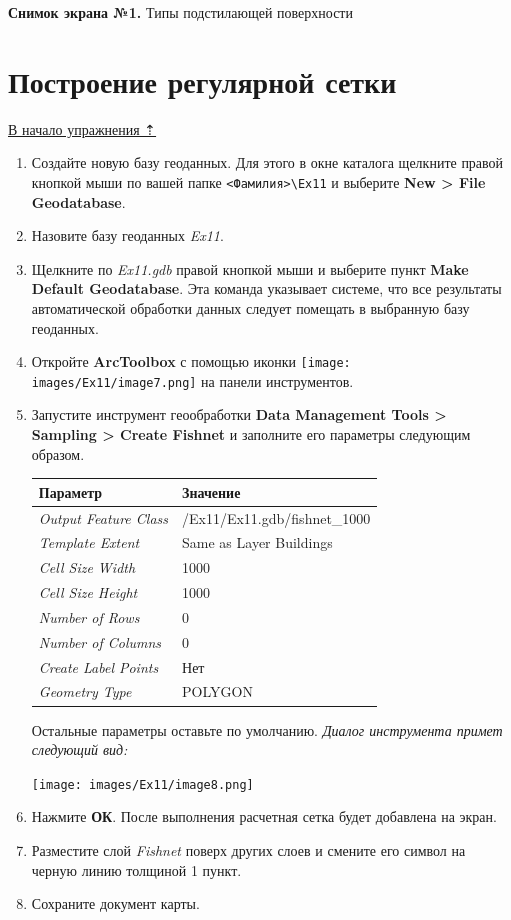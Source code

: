 \documentclass[12pt,]{book}
\begin{document}
\textbf{Снимок экрана №1.} Типы подстилающей поверхности

\hypertarget{land-cover-hydro-fishnet}{%
\section{Построение регулярной сетки}\label{land-cover-hydro-fishnet}}

\protect\hyperlink{land-cover-hydro}{В начало упражнения ⇡}

\begin{enumerate}
\def\labelenumi{\arabic{enumi}.}
\item
  Создайте новую базу геоданных. Для этого в окне каталога щелкните правой кнопкой мыши по вашей папке \texttt{\textless{}Фамилия\textgreater{}\textbackslash{}Ex11} и выберите \textbf{New \textgreater{} File Geodatabase}.
\item
  Назовите базу геоданных \emph{Ex11}.
\item
  Щелкните по \emph{Ex11.gdb} правой кнопкой мыши и выберите пункт \textbf{Make Default Geodatabase}. Эта команда указывает системе, что все результаты автоматической обработки данных следует помещать в выбранную базу геоданных.
\item
  Откройте \textbf{ArcToolbox} с помощью иконки \texttt{[image: images/Ex11/image7.png]} на панели инструментов.
\item
  Запустите инструмент геообработки \textbf{Data Management Tools \textgreater{} Sampling \textgreater{} Create Fishnet} и заполните его параметры следующим образом.

  \begin{longtable}[]{@{}ll@{}}
  \toprule
  Параметр & Значение\tabularnewline
  \midrule
  \endhead
  \emph{Output Feature Class} & /Ex11/Ex11.gdb/fishnet\_1000\tabularnewline
  \emph{Template Extent} & Same as Layer Buildings\tabularnewline
  \emph{Cell Size Width} & 1000\tabularnewline
  \emph{Cell Size Height} & 1000\tabularnewline
  \emph{Number of Rows} & 0\tabularnewline
  \emph{Number of Columns} & 0\tabularnewline
  \emph{Create Label Points} & Нет\tabularnewline
  \emph{Geometry Type} & POLYGON\tabularnewline
  \bottomrule
  \end{longtable}

  Остальные параметры оставьте по умолчанию. \emph{Диалог инструмента примет следующий вид:}

  \texttt{[image: images/Ex11/image8.png]}
\item
  Нажмите \textbf{ОК}. После выполнения расчетная сетка будет добавлена на экран.
\item
  Разместите слой \emph{Fishnet} поверх других слоев и смените его символ на черную линию толщиной 1 пункт.
\item
  Сохраните документ карты.
\end{enumerate}
\end{document}
